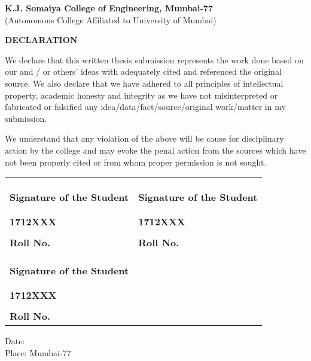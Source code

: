 \newpage
    \begin{center}
    
        \vspace*{-1cm}
        \large
        \textbf{K.J. Somaiya College of Engineering, Mumbai-77}\\
        \normalsize
        (Autonomous College Affiliated to University of Mumbai)\\
        
        \vspace{0.8cm}
        
        \large
        \textbf{DECLARATION}\\
        \vspace{0.5cm}
        
    \end{center}
\noindent
{We declare that this written thesis submission represents the work done based on our and / or others’ ideas with adequately cited and referenced the original source. We also declare that we have adhered to all principles of intellectual property, academic honesty and integrity as we have not misinterpreted or fabricated or falsified any idea/data/fact/source/original work/matter in my submission. \par

We understand that any violation of the above will be cause for disciplinary action by the college and may evoke the penal action from the sources which have not been properly cited or from whom proper permission is not sought.}

\begin{table}[h]
\centering
\begin{tabular}{| X | X |}
\hline
 & \\
 & \\
\hrulefill & \hrulefill \\
\textbf{Signature of the Student} & \textbf{Signature of the Student} \\
\vspace{4cm} & \vspace{4cm} \\
 & \\
\textbf{1712XXX} & \textbf{1712XXX} \\
\hrulefill & \hrulefill \\
\textbf{Roll No.} & \textbf{Roll No.} \\
\hline
 & \\
 & \\
\hrulefill & \\
\textbf{Signature of the Student} & \\
\vspace{4cm} & \\
 & \\
\textbf{1712XXX} &  \\
\hrulefill &  \\
\textbf{Roll No.} & \\
\hline
\end{tabular}
\end{table}


\noindent
{\large Date:}\\
{\large Place: Mumbai-77}
